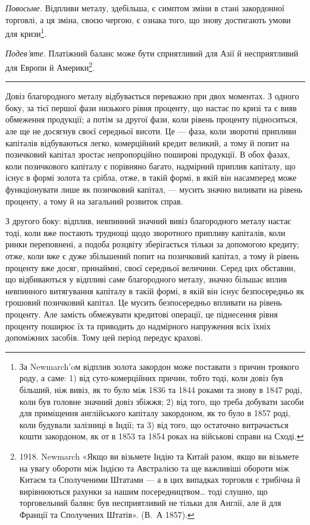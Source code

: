 
\emph{Повосьме.} Відпливи металу, здебільша, є симптом зміни в стані закордонної
торговлі, а ця зміна, своєю чергою, є ознака того, що знову достигають
умови для кризи\footnote{
За Newmarch’oм відплив золота закордон може поставати з причин троякого роду, а саме:
1) від суто-комерційних причин, тобто тоді, коли довіз був більший, ніж вивіз, як то було між 1836
та 1844 роками та знову в 1847 роді, коли був головне значний довіз збіжжя; 2) від того, що треба
добувати засоби для приміщення англійського капіталу закордоном, як то було в 1857 роді, коли
будували
залізниці в Індії; та 3) від того, що остаточно витрачається кошти закордоном, як от в 1853
та 1854 роках на військові справи на Сході.
}.

\emph{Подев’яте.} Платіжний баланс може бути сприятливий для Азії й несприятливий
для Европи й Америки\footnote{
1918. Newmarch «Якщо ви візьмете Індію та Китай разом, якщо ви візьмете на увагу
обороти між Індією та Австралією та ще важливіші обороти між Китаєм та Сполученими Штатами — а в
цих випадках торговля є трибічна й вирівнюються рахунки за нашим посередництвом\dots{} тоді слушно,
що торговельний балянс був несприятливий не тільки для Англії, але й для Франції та Сполучених
Штатів». (В.~А 1857).
}.

\pfbreak

Довіз благородного металу відбувається переважно при двох моментах.
З одного боку, за тієї першої фази низького рівня проценту, що настає по
кризі та є вияв обмеження продукції; а потім за другої фази, коли рівень проценту
підноситься, але ще не досягнув своєї середньої висоти. Це — фаза, коли
зворотні припливи капіталів відбуваються легко, комерційний кредит великий,
а тому й попит на позичковий капітал зростає непропорційно поширові продукції.
В обох фазах, коли позичкового капіталу є порівняно багато, надмірний
приплив капіталу, що існує в формі золота та срібла, отже, в такій формі,
в якій він насамперед може функціонувати лише як позичковий капітал, — мусить
значно виливати на рівень проценту, а тому й на загальний розвиток справ.

З другого боку: відплив, невпинний значний вивіз благородного металу
настає тоді, коли вже постають труднощі щодо зворотного припливу капіталів,
коли ринки переповнені, а подоба розцвіту зберігається тільки за допомогою
кредиту; отже, коли вже є дуже збільшений попит на позичковий капітал, а тому
й рівень проценту вже досяг, принаймні, своєї середньої величини. Серед цих
обставин, що відбиваються у відпливі саме благородного металу, значно більшає
вплив невпинного витягування капіталу в такій формі, в якій він існує безпосередньо
як грошовий позичковий капітал. Це мусить безпосередньо впливати
на рівень проценту. Але замість обмежувати кредитові операції, це піднесення
рівня проценту поширює їх та приводить до надмірного напруження всіх їхніх
допоміжних засобів. Тому цей період передує крахові.

